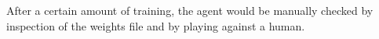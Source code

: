 After a certain amount of training,
the agent would be manually checked by inspection of the weights file and by
playing against a human.

%

